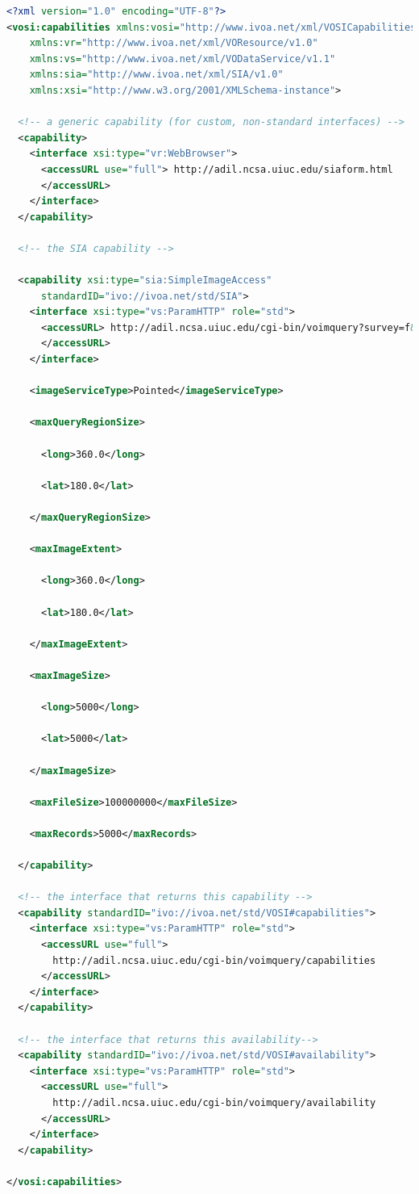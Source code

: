 \documentclass[11pt,letter]{ivoa}
\begin{document}
\begin{lstlisting}[language=XML,basicstyle=\footnotesize]
<?xml version="1.0" encoding="UTF-8"?>
<vosi:capabilities xmlns:vosi="http://www.ivoa.net/xml/VOSICapabilities/v1.0"
    xmlns:vr="http://www.ivoa.net/xml/VOResource/v1.0"
    xmlns:vs="http://www.ivoa.net/xml/VODataService/v1.1"
    xmlns:sia="http://www.ivoa.net/xml/SIA/v1.0"
    xmlns:xsi="http://www.w3.org/2001/XMLSchema-instance">

  <!-- a generic capability (for custom, non-standard interfaces) -->
  <capability>
    <interface xsi:type="vr:WebBrowser">
      <accessURL use="full"> http://adil.ncsa.uiuc.edu/siaform.html 
      </accessURL>
    </interface>
  </capability>
  
  <!-- the SIA capability -->
 
  <capability xsi:type="sia:SimpleImageAccess" 
      standardID="ivo://ivoa.net/std/SIA">
    <interface xsi:type="vs:ParamHTTP" role="std">
      <accessURL> http://adil.ncsa.uiuc.edu/cgi-bin/voimquery?survey=f&amp; 
      </accessURL>
    </interface>

    <imageServiceType>Pointed</imageServiceType>

    <maxQueryRegionSize>

      <long>360.0</long>

      <lat>180.0</lat>

    </maxQueryRegionSize>

    <maxImageExtent>

      <long>360.0</long>

      <lat>180.0</lat>

    </maxImageExtent>

    <maxImageSize>

      <long>5000</long>

      <lat>5000</lat>

    </maxImageSize>

    <maxFileSize>100000000</maxFileSize>

    <maxRecords>5000</maxRecords>

  </capability>

  <!-- the interface that returns this capability -->
  <capability standardID="ivo://ivoa.net/std/VOSI#capabilities">
    <interface xsi:type="vs:ParamHTTP" role="std">
      <accessURL use="full"> 
        http://adil.ncsa.uiuc.edu/cgi-bin/voimquery/capabilities 
      </accessURL>
    </interface>
  </capability>

  <!-- the interface that returns this availability-->
  <capability standardID="ivo://ivoa.net/std/VOSI#availability">
    <interface xsi:type="vs:ParamHTTP" role="std">
      <accessURL use="full"> 
        http://adil.ncsa.uiuc.edu/cgi-bin/voimquery/availability 
      </accessURL>
    </interface>
  </capability>

</vosi:capabilities>
\end{lstlisting}
\end{document}
